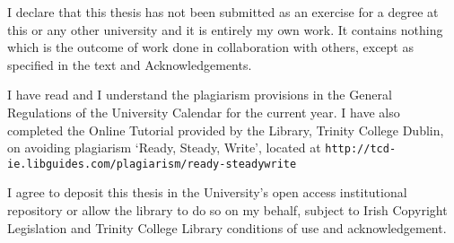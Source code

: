 
\begin{declaration}

I declare that this thesis has not been submitted as an exercise for a degree at this or
any other university and it is entirely my own work. It contains nothing which is the outcome of work done in collaboration with others, except as specified in the text and Acknowledgements. 

I have read and I understand the plagiarism provisions in the General
Regulations of the University Calendar for the current year. I have also completed the Online Tutorial provided by the Library, Trinity College Dublin,  on avoiding plagiarism ‘Ready,
Steady, Write’, located at {\tt http://tcd-ie.libguides.com/plagiarism/ready-steadywrite} 

I agree to deposit this thesis in the University’s open access institutional repository or
allow the library to do so on my behalf, subject to Irish Copyright Legislation and
Trinity College Library conditions of use and acknowledgement.



\end{declaration}